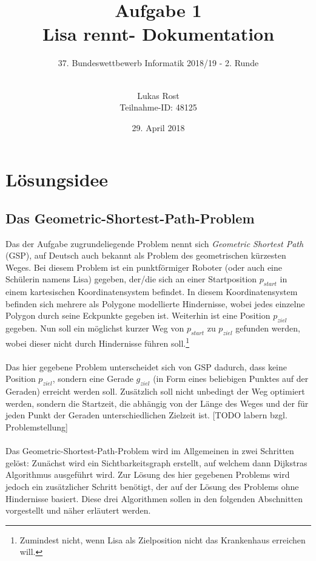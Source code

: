\documentclass[a4paper, notitlepage, 12pt]{scrartcl}
\author{Lukas Rost \\ \small{Teilnahme-ID: 48125}}
\title{Aufgabe 1 \\ \glqq Lisa rennt\grqq  - Dokumentation}
\subtitle{37. Bundeswettbewerb Informatik 2018/19 - 2. Runde \\~\\}
\date{29. April 2018}
\begin{document}
\renewcommand{\contentsname}{\centerline{Inhaltsverzeichnis}}
 \maketitle
 \tableofcontents
 \thispagestyle{empty}
 \newpage
 \setcounter{page}{1}
 
 \section{Lösungsidee}
 \subsection{Das Geometric-Shortest-Path-Problem}
 Das der Aufgabe zugrundeliegende Problem nennt sich \textit{Geometric Shortest Path} (GSP), auf Deutsch auch bekannt als Problem des geometrischen kürzesten Weges. Bei diesem Problem ist ein punktförmiger Roboter (oder auch eine Schülerin namens Lisa) gegeben, der/die sich an einer Startposition $p_{start}$ in einem kartesischen Koordinatensystem befindet. In diesem Koordinatensystem befinden sich mehrere als Polygone modellierte Hindernisse, wobei jedes einzelne Polygon durch seine Eckpunkte gegeben ist. Weiterhin ist eine Position $p_{ziel}$ gegeben. Nun soll ein möglichst kurzer Weg von $p_{start}$ zu $p_{ziel}$ gefunden werden, wobei dieser nicht durch Hindernisse führen soll.\footnote{Zumindest nicht, wenn Lisa als Zielposition nicht das Krankenhaus erreichen will.}\cite{Src:noem} \\ \\
 Das hier gegebene Problem unterscheidet sich von GSP dadurch, dass keine Position $p_{ziel}$, sondern eine Gerade $g_{ziel}$ (in Form eines beliebigen Punktes auf der Geraden) erreicht werden soll. Zusätzlich soll nicht unbedingt der Weg optimiert werden, sondern die Startzeit, die abhängig von der Länge des Weges und der für jeden Punkt der Geraden unterschiedlichen Zielzeit ist.
 [TODO labern bzgl. Problemstellung] \\ \\
 Das Geometric-Shortest-Path-Problem wird im Allgemeinen in zwei Schritten gelöst: Zunächst wird ein Sichtbarkeitsgraph erstellt, auf welchem dann Dijkstras Algorithmus ausgeführt wird. Zur Lösung des hier gegebenen Problems wird jedoch ein zusätzlicher Schritt benötigt, der auf der Lösung des Problems ohne Hindernisse basiert. Diese drei Algorithmen sollen in den folgenden Abschnitten vorgestellt und näher erläutert werden.
\end{document}
